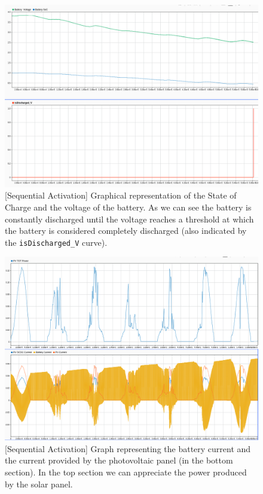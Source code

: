 \documentclass[a4paper]{article}
\begin{document}
        \begin{figure}[htp]
            \centering
            \includegraphics[width=0.8 \columnwidth]{./screenshots/SeqActiv/2Minutes/BattV-BattSoC-isDischargedV.png}
            \caption{
                    \label{fig:BattV-BattSoC-isDischargedV}
                    [Sequential Activation] Graphical representation of the State of Charge and the voltage of the battery. As we can see the battery is constantly discharged until the voltage reaches a threshold at which the battery is considered completely discharged (also indicated by the \texttt{isDischarged\_V} curve).
            }
        \end{figure}

        \begin{figure}[htp]
            \centering
            \includegraphics[width=1 \columnwidth]{./screenshots/SeqActiv/2Minutes/PVTotPower-Currents.png}
            \caption{
                    \label{fig:PVTotPower-Currents}
                    [Sequential Activation] Graph representing the battery current and the current provided by the photovoltaic panel (in the bottom section). In the top section we can appreciate the power produced by the solar panel.
            }
        \end{figure}
\end{document}
